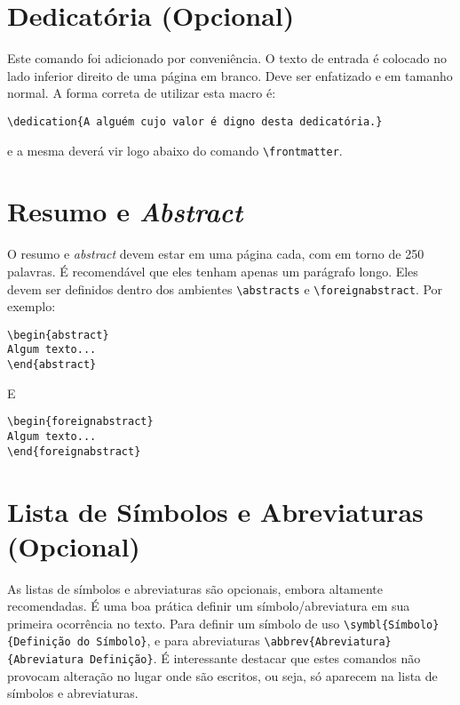 \documentclass[report]{uftex}
\begin{document}
\section{Dedicatória (Opcional)}
\label{sec:dedicatoria}

Este comando foi adicionado por conveniência. O texto de entrada é colocado no lado inferior direito de uma página em branco. Deve ser enfatizado e em tamanho normal. A forma correta de utilizar esta macro é:
\begin{verbatim}\dedication{A alguém cujo valor é digno desta dedicatória.}\end{verbatim} e a mesma deverá vir logo abaixo do comando \verb+\frontmatter+.


\section{Resumo e \emph{Abstract}}
\label{sec:resumos}

O resumo e \emph{abstract} devem estar em uma página cada, com em torno de 250 palavras. É recomendável que eles tenham apenas um parágrafo longo. Eles devem ser definidos dentro dos ambientes \verb+\abstracts+ e \verb+\foreignabstract+. Por exemplo:

\begin{verbatim}
\begin{abstract}
Algum texto...    
\end{abstract}
\end{verbatim}

E

\begin{verbatim}
\begin{foreignabstract}
Algum texto...    
\end{foreignabstract}
\end{verbatim}


\section{Lista de Símbolos e Abreviaturas (Opcional)}
\label{sec:simbolos-e-abreviaturas}

\noindent As listas de símbolos e abreviaturas são opcionais, embora altamente recomendadas. \cite{JW82}
É uma boa prática definir um símbolo/abreviatura em sua primeira ocorrência no texto. Para definir um símbolo de uso \verb+\symbl{Símbolo}{Definição do Símbolo}+, e para abreviaturas \verb+\abbrev{Abreviatura}{Abreviatura Definição}+.
É interessante destacar que estes comandos não provocam alteração no lugar onde são escritos, ou seja, só aparecem na lista de símbolos e abreviaturas. %
\end{document}
